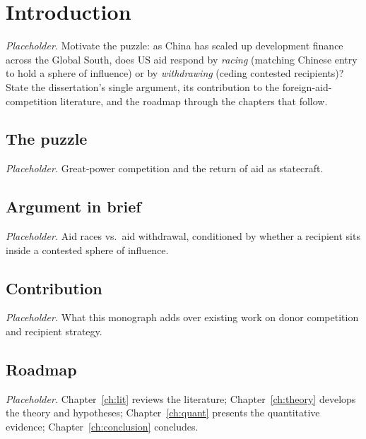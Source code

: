 \chapter{Introduction}
\label{ch:intro}

\textit{Placeholder.} Motivate the puzzle: as China has scaled up development
finance across the Global South, does US aid respond by \emph{racing} (matching
Chinese entry to hold a sphere of influence) or by \emph{withdrawing} (ceding
contested recipients)? State the dissertation's single argument, its
contribution to the foreign-aid-competition literature, and the roadmap through
the chapters that follow.

\section{The puzzle}
\textit{Placeholder.} Great-power competition and the return of aid as
statecraft.

\section{Argument in brief}
\textit{Placeholder.} Aid races vs.\ aid withdrawal, conditioned by whether a
recipient sits inside a contested sphere of influence.

\section{Contribution}
\textit{Placeholder.} What this monograph adds over existing work on donor
competition and recipient strategy.

\section{Roadmap}
\textit{Placeholder.} Chapter~\ref{ch:lit} reviews the literature;
Chapter~\ref{ch:theory} develops the theory and hypotheses;
Chapter~\ref{ch:quant} presents the quantitative evidence;
Chapter~\ref{ch:conclusion} concludes.
